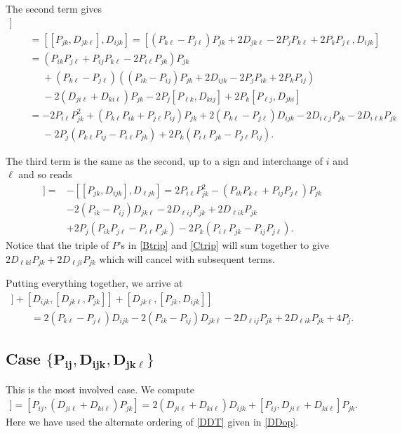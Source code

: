 \documentclass[10pt,a4paper]{amsart}
\numberwithin{equation}{section}
\begin{document}
 The second term gives
\begin{gather*}
   [ D_{ ijk}, [D_{jk\ell}, P_{jk}]]\\
   \qquad =  [[  P_{jk},D_{ jk \ell }], D_{ijk}]
   = [ (P_{k\ell} -P_{j\ell})P_{jk} +2D_{jk\ell} -2P_jP_{k \ell}+2P_k P_{j \ell}, D_{ijk}]\nonumber \\
  \qquad = ( P_{ik}P_{j\ell}+P_{ij}P_{k \ell}-2P_{i\ell}P_{jk}) P_{jk}\nonumber \\
  \phantom{\qquad =}{}   + (P_{k \ell}-P_{j\ell})\left((P_{ik} -P_{ij})P_{jk} +2D_{ijk} -2P_jP_{ik}+2P_kP_{ij}\right) \nonumber \\
  \phantom{\qquad =}{}    - 2(D_{j i\ell}+D_{ki\ell}) P_{jk} - 2P_j[P_{\ell k},D_{kij}]+2P_k[ P_{\ell j}, D_{jki}]\nonumber\\
 \qquad =  -2P_{i\ell}P_{jk}^2 +(P_{k\ell}P_{ik}+ P_{j\ell} P_{ij}) P_{jk}
   + 2(P_{k \ell}-P_{j\ell})D_{ijk} - 2D_{i\ell j}P_{jk}- 2D_{i\ell k}P_{jk}\nonumber\\
   \phantom{\qquad =}{}    - 2P_j\left( P_{k\ell}P_{ij} -P_{i\ell}P_{jk}\right) + 2P_k\left( P_{i\ell}P_{jk} - P_{j\ell}P_{ij}\right).\label{Btrip}
   \end{gather*}

   The third term is the same as the second, up to a sign and interchange of $i$ and $\ell$ and so reads
\begin{align}
[ D_{jk\ell}, [ P_{jk}, D_{ijk}]]={}&- [[ P_{jk}, D_{ijk}], D_{\ell jk}]
 = 2P_{i\ell}P_{jk}^2 -(P_{ik}P_{k\ell}+ P_{ij} P_{j\ell}) P_{jk}\nonumber \\
 &- 2(P_{ik }-P_{ij})D_{jk\ell} - 2D_{\ell i j}P_{jk}+2D_{\ell i k}P_{jk}\nonumber\\
 & +2P_j\left( P_{ik}P_{j\ell} -P_{i\ell}P_{jk}\right) - 2P_k\left( P_{i\ell}P_{jk} - P_{ij}P_{j\ell}\right). \label{Ctrip}
\end{align}
Notice that the triple of $P$'s in \eqref{Btrip} and \eqref{Ctrip} will sum together to give $2D_{\ell ki}P_{jk}+2D_{\ell ji}P_{jk}$ which will cancel with subsequent terms.

Putting everything together, we arrive at
\begin{gather*}
 [ P_{jk}, [ D_{ ijk}, D_{jkl}]] +[ D_{ ijk}, [D_{jk\ell}, P_{jk}]] + [ D_{jk\ell}, [ P_{jk}, D_{ijk}]]\\
 \qquad = 2(P_{k \ell}-P_{j\ell})D_{ijk} - 2(P_{ik }-P_{ij})D_{jk\ell} - 2D_{\ell i j}P_{jk}+2D_{\ell i k}P_{jk} +4P_j .
 \end{gather*}

\subsection[Case \{ P\_i j , D\_ ijk, D\_ jkl\}]{Case $\boldsymbol{\{ P_{i j }, D_{ ijk}, D_{ jk\ell}\}} $}
 This is the most involved case. We compute
 \begin{gather*}
 [ P_{i j}, [ D_{ ijk}, D_{jkl}]] = [P_{ij}, (D_{ji\ell} +D_{ki\ell})P_{jk} ]
= 2 (D_{ji\ell}+D_{ki\ell})D_{ijk} + [P_{ij},D_{ji \ell} +D_{ki\ell} ]P_{jk}.
\end{gather*}
 Here we have used the alternate ordering of \eqref{DDT} given in \eqref{DDop}.
\end{document}
